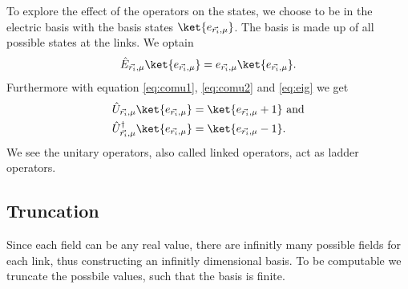 To explore the effect of the operators on the states, we choose to be in the electric basis with the basis states $\ket{e_{\vec{r_i}, \mu}}$. The basis is made up of all possible states at the links. We optain
\begin{align}
	\hat{E}_{\vec{r_i}, \mu}\ket{e_{\vec{r_i}, \mu}}=e_{\vec{r_i}, \mu}\ket{e_{\vec{r_i}, \mu}}.\label{eq:eig}
\end{align}
Furthermore with equation \ref{eq:comu1}, \ref{eq:comu2} and \ref{eq:eig} we get
\begin{align}
	\hat{U}_{\vec{r_i}, \mu}\ket{e_{\vec{r_i}, \mu}}      & =\ket{e_{\vec{r_i}, \mu}+1}\text{ and}\label{eq:eigu1} \\
	\hat{U}_{\vec{r_i}, \mu}^\dag\ket{e_{\vec{r_i}, \mu}} & =\ket{e_{\vec{r_i}, \mu}-1}.\label{eq:eigu2}
\end{align}
We see the unitary operators, also called linked operators, act as ladder operators.
\subsection{Truncation}
Since each field can be any real value, there are infinitly many possible fields for each link, thus constructing an infinitly dimensional basis. To be computable we truncate the possbile values, such that the basis is finite.

